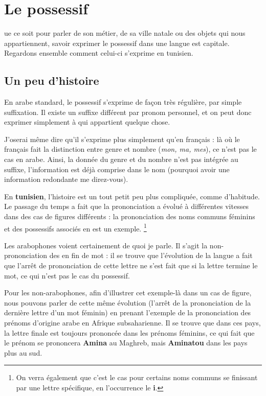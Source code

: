 \chapter{Le possessif}
ue ce soit pour parler de son métier, de sa ville natale ou des objets qui nous appartiennent, savoir exprimer le possessif dans une langue est capitale. Regardons ensemble comment celui-ci s'exprime en tunisien.

\section{Un peu d'histoire}
En arabe standard, le possessif s'exprime de façon très régulière, par simple suffixation. Il existe un suffixe différent par pronom personnel, et on peut donc exprimer simplement à qui appartient quelque chose. 

J'oserai même dire qu'il s'exprime plus simplement qu'en français : là où le français fait la distinction entre genre et nombre (\textit{mon, ma, mes}), ce n'est pas le cas en arabe. Ainsi, la donnée du genre et du nombre n'est pas intégrée au suffixe, l'information est déjà comprise dans le nom (pourquoi avoir une information redondante me direz-vous).

En \textbf{tunisien}, l'histoire est un tout petit peu plus compliquée, comme \linebreak d'habitude. Le passage du temps a fait que la prononciation a évolué à différentes vitesses dans des cas de figures différents : la prononciation des noms communs féminins et des possessifs associés en est un exemple. \footnote{On verra également que c'est le cas pour certains noms communs se finissant par une lettre spécifique, en l'occurrence le \textbf{i}.}

Les arabophones voient certainement de quoi je parle. Il s'agit la non-prononciation des  en fin de mot : il se trouve que l'évolution de la langue a fait que l'arrêt de prononciation de cette lettre ne s'est fait que si la lettre termine le mot, ce qui n'est pas le cas du possessif. 

Pour les non-arabophones, afin d'illustrer cet exemple-là dans un cas de figure, nous pouvons parler de cette même évolution (l'arrêt de la prononciation de la dernière lettre d'un mot féminin) en prenant l'exemple de la prononciation des prénoms d'origine arabe en Afrique subsaharienne. Il se trouve que dans ces pays, la lettre finale est toujours prononcée dans les prénoms féminins, ce qui fait que le prénom  se prononcera \textbf{Amina} au Maghreb, mais \textbf{Aminatou} dans les pays plus au sud.

